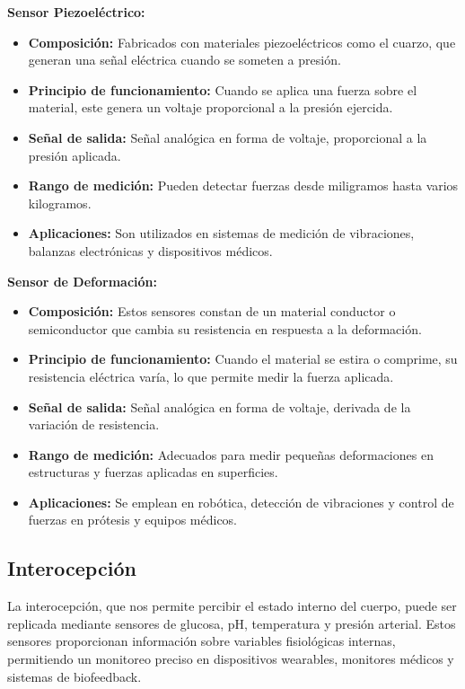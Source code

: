 \documentclass[conference]{IEEEtran}
\begin{document}
\textbf{Sensor Piezoeléctrico:}
\begin{itemize}
    \item \textbf{Composición:} Fabricados con materiales piezoeléctricos como el cuarzo, que generan una señal eléctrica cuando se someten a presión.
    \item \textbf{Principio de funcionamiento:} Cuando se aplica una fuerza sobre el material, este genera un voltaje proporcional a la presión ejercida.
    \item \textbf{Señal de salida:} Señal analógica en forma de voltaje, proporcional a la presión aplicada.
    \item \textbf{Rango de medición:} Pueden detectar fuerzas desde miligramos hasta varios kilogramos.
    \item \textbf{Aplicaciones:} Son utilizados en sistemas de medición de vibraciones, balanzas electrónicas y dispositivos médicos.
\end{itemize}

\textbf{Sensor de Deformación:}
\begin{itemize}
    \item \textbf{Composición:} Estos sensores constan de un material conductor o semiconductor que cambia su resistencia en respuesta a la deformación.
    \item \textbf{Principio de funcionamiento:} Cuando el material se estira o comprime, su resistencia eléctrica varía, lo que permite medir la fuerza aplicada.
    \item \textbf{Señal de salida:} Señal analógica en forma de voltaje, derivada de la variación de resistencia.
    \item \textbf{Rango de medición:} Adecuados para medir pequeñas deformaciones en estructuras y fuerzas aplicadas en superficies.
    \item \textbf{Aplicaciones:} Se emplean en robótica, detección de vibraciones y control de fuerzas en prótesis y equipos médicos.
\end{itemize}

\subsection{Interocepción}

La interocepción, que nos permite percibir el estado interno del cuerpo, puede ser replicada mediante sensores de glucosa, pH, temperatura y presión arterial. Estos sensores proporcionan información sobre variables fisiológicas internas, permitiendo un monitoreo preciso en dispositivos wearables, monitores médicos y sistemas de biofeedback.\\
\end{document}
